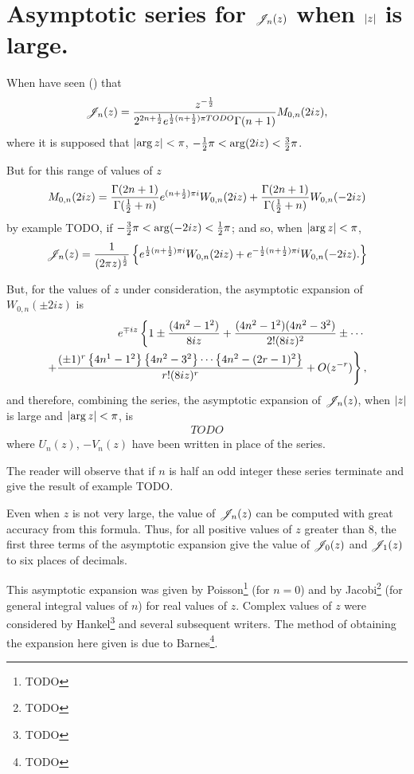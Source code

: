 \documentclass{book}
\begin{document}
\section{Asymptotic series for $\mathscr{J}_n(z)$ when $\left| z \right|$ is large.}
When have seen () that
$$
\mathscr{J}_n(z)
=
\frac{z^{-\frac{1}{2}}}{2^{2n+\frac{1}{2}} e^{\frac{1}{2}(n+\frac{1}{2})\pi TODO} \Gamma(n+1)}
M_{0,n}(2iz),
$$
where it is supposed that 
$\left|  \arg z  \right| < \pi$,
$-\frac{1}{2}\pi < \arg (2iz) < \frac{3}{2} \pi$.

But for this range of values of $z$
$$
M_{0,n}(2iz)
=
\frac{\Gamma(2n+1)}{\Gamma(\frac{1}{2} + n)}
e^{(n+\frac{1}{2})\pi i}
W_{0,n}(2iz)
+
\frac{\Gamma(2n+1)}{\Gamma(\frac{1}{2}+n)}
W_{0,n}(-2iz)
$$
by  example TODO,
if
$-\frac{3}{2} \pi < \arg (-2iz) < \frac{1}{2} \pi$; and so, when
$\left| \arg z \right| < \pi$,
$$
\mathscr{J}_n(z)
=
\frac{1}{(2\pi z)^{\frac{1}{2}}}
\left\{ 
  e^{\frac{1}{2} (n+\frac{1}{2})\pi i} W_{0,n}(2iz)
  +
  e^{-\frac{1}{2} (n+\frac{1}{2})\pi i} W_{0,n}(-2iz).
   \right\}
  $$

But, for the values of $z$ under consideration, the asymptotic
expansion of $W_{0,n}(\pm 2 i z)$ is
\begin{align*}
  e^{\mp i z}
  \left\{
    1
    \pm \frac{(4n^2 - 1^2)}{8iz}
    + \frac{ (4n^2-1^2)(4n^2-3^2)}{2! (8iz)^2}
    \pm \cdots
  \right.
  \\
  \left.
    + \frac{ (\pm 1)^r \left\{ 4n^1-1^2 \right\} \left\{ 4n^2-3^2 \right\} \cdots
      \left\{ 4n^2 - (2r-1)^2 \right\}  }{r! (8iz)^r}
    + O(z^{-r})
    \right\},
  \end{align*}
  and therefore, combining the series, the asymptotic expansion of
  $\mathscr{J}_n(z)$, when $\left| z \right|$ is large and $\left| \arg z \right| < \pi$, is
  \begin{align*}
    TODO
  \end{align*}
  where $U_n(z)$, $-V_n(z)$ have been written in place of the series.

  The reader will observe that if $n$ is half an odd integer these
  series terminate and give the result of 
  example TODO.

  Even when $z$ is not very large, the value of $\mathscr{J}_n(z)$ can be
  computed with great accuracy from this formula. Thus, for all
  positive values of $z$ greater than $8$, the first three terms of
  the asymptotic expansion give the value of $\mathscr{J}_0(z)$ and $\mathscr{J}_1(z)$ to
  six places of decimals.

  This asymptotic expansion was given by Poisson\footnote{TODO} (for
  $n=0$) and by Jacobi\footnote{TODO} (for general integral values of
  $n$) for real values of $z$.
  Complex values of $z$ were considered by Hankel\footnote{TODO} and
  several subsequent writers. The method of obtaining the expansion
  here given is due to Barnes\footnote{TODO}.
\end{document}
